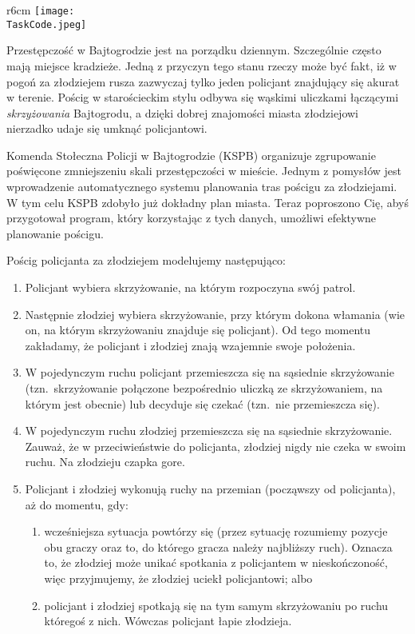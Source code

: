 \documentclass{boi2014-pl}
\renewcommand{\TaskCode}{coprobber}
\begin{document}
    \begin{wrapfigure}[8]{r}{6cm}
        \vspace{-24pt}
		\texttt{[image: \\TaskCode.jpeg]}
	\end{wrapfigure}

  \medskip
    Przestępczość w Bajtogrodzie jest na porządku dziennym.
    Szczególnie często mają miejsce kradzieże.
    Jedną z przyczyn tego stanu rzeczy może być fakt, iż w pogoń za złodziejem
    rusza zazwyczaj tylko jeden policjant znajdujący się akurat w terenie.
    Pościg w starościeckim stylu odbywa się wąskimi uliczkami łączącymi
    \emph{skrzyżowania} Bajtogrodu, a dzięki dobrej znajomości miasta złodziejowi
    nierzadko udaje się umknąć policjantowi.

  \smallskip
    Komenda Stołeczna Policji w Bajtogrodzie (KSPB) organizuje zgrupowanie poświęcone
    zmniejszeniu skali przestępczości w mieście.
    Jednym z pomysłów jest wprowadzenie automatycznego systemu planowania tras pościgu
    za złodziejami.
    W tym celu KSPB zdobyło już dokładny plan miasta.
    Teraz poproszono Cię, abyś przygotował program, który korzystając z tych danych,
    umożliwi efektywne planowanie pościgu.

    Pościg policjanta za złodziejem modelujemy następująco:
    \begin{enumerate}
        \item Policjant wybiera skrzyżowanie, na którym rozpoczyna swój patrol.
        \item Następnie złodziej wybiera skrzyżowanie, przy którym dokona włamania
            (wie on, na którym skrzyżowaniu znajduje się policjant).
            Od tego momentu zakładamy, że policjant i złodziej znają wzajemnie
            swoje położenia.
        \item W pojedynczym ruchu policjant przemieszcza się na sąsiednie skrzyżowanie
            (tzn.\ skrzyżowanie połączone bezpośrednio uliczką ze skrzyżowaniem,
            na którym jest obecnie) lub decyduje się czekać (tzn.\ nie przemieszcza się).
        \item W pojedynczym ruchu złodziej przemieszcza się na sąsiednie skrzyżowanie.
            Zauważ, że w przeciwieństwie do policjanta, złodziej nigdy nie czeka
            w swoim ruchu.
            Na złodzieju czapka gore.
        \item Policjant i złodziej wykonują ruchy na przemian (począwszy od policjanta),
            aż do momentu, gdy:
        \begin{enumerate}
            \item wcześniejsza sytuacja powtórzy się (przez sytuację rozumiemy pozycje
                obu graczy oraz to, do którego gracza należy najbliższy ruch).
                Oznacza to, że złodziej może unikać spotkania z policjantem w nieskończoność,
                więc przyjmujemy, że złodziej uciekł policjantowi; albo
            \item policjant i złodziej spotkają się na tym samym skrzyżowaniu
                po ruchu któregoś z nich.
                Wówczas policjant łapie złodzieja.
        \end{enumerate}
    \end{enumerate}
\end{document}
